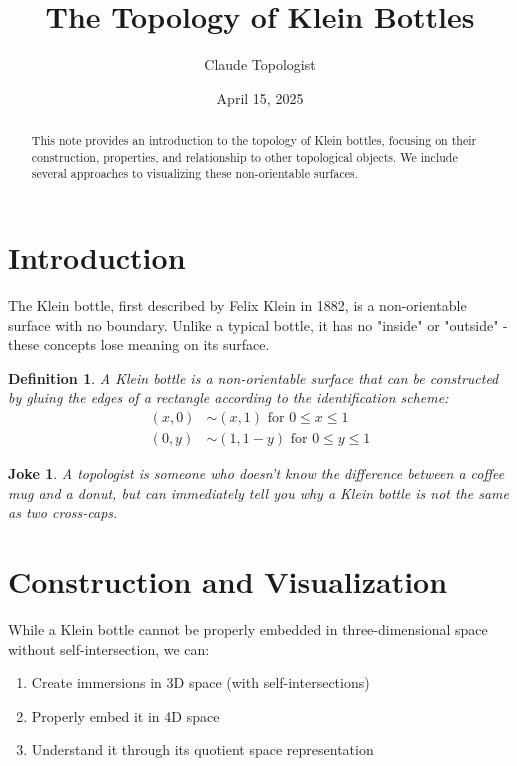 \documentclass{article}
\title{The Topology of Klein Bottles}
\author{Claude Topologist}
\date{April 15, 2025}
\newtheorem{definition}{Definition}
\newtheorem{joke}{Joke}
\begin{document}
\maketitle

\begin{abstract}
    This note provides an introduction to the topology of Klein bottles, focusing on their construction, properties, and relationship to other topological objects. We include several approaches to visualizing these non-orientable surfaces.
\end{abstract}

\section{Introduction}

The Klein bottle, first described by Felix Klein in 1882, is a non-orientable surface with no boundary. Unlike a typical bottle, it has no "inside" or "outside" - these concepts lose meaning on its surface.

\begin{definition}
    A Klein bottle is a non-orientable surface that can be constructed by gluing the edges of a rectangle according to the identification scheme: 
    \begin{align}
        (x, 0) &\sim (x, 1) \text{ for } 0 \leq x \leq 1\\
        (0, y) &\sim (1, 1-y) \text{ for } 0 \leq y \leq 1
    \end{align}
\end{definition}

\begin{joke}
    A topologist is someone who doesn't know the difference between a coffee mug and a donut, but can immediately tell you why a Klein bottle is not the same as two cross-caps.
\end{joke}

\section{Construction and Visualization}

While a Klein bottle cannot be properly embedded in three-dimensional space without self-intersection, we can:

\begin{enumerate}
    \item Create immersions in 3D space (with self-intersections)
    \item Properly embed it in 4D space
    \item Understand it through its quotient space representation
\end{enumerate}
\end{document}
